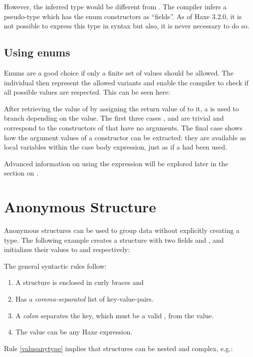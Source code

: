 {{However, the inferred type would be different from . The compiler infers a pseudo-type which has the enum constructors as ``fields''. As of Haxe 3.2.0, it is not possible to express this type in syntax but also, it is never necessary to do so.}



\subsection{Using enums}
\label{types-enum-using}

Enums are a good choice if only a finite set of values should be allowed. The individual  then represent the allowed variants and enable the compiler to check if all possible values are respected. This can be seen here:


After retrieving the value of  by assigning the return value of  to it, a  is used to branch depending on the value. The first three cases ,  and  are trivial and correspond to the constructors of  that have no arguments. The final case  shows how the argument values of a constructor can be extracted: they are available as local variables within the case body expression, just as if a  had been used.

Advanced information on using the  expression will be explored later in the section on .


\section{Anonymous Structure}
\label{types-anonymous-structure}

Anonymous structures can be used to group data without explicitly creating a type. The following example creates a structure with two fields  and , and initializes their values to  and  respectively:

The general syntactic rules follow:

\begin{enumerate}
	\item A structure is enclosed in curly braces \expr{$\left\{\right\}$} and
	\item Has a \emph{comma-separated} list of key-value-pairs.
	\item A \emph{colon} separates the key, which must be a valid , from the value.
	\item\label{valueanytype} The value can be any Haxe expression.
\end{enumerate}
Rule \ref{valueanytype} implies that structures can be nested and complex, e.g.:

}

